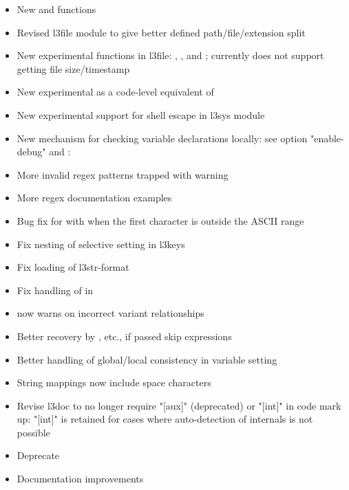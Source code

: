 \documentclass{ltnews}
\begin{document}
\begin{itemize}
\item New  and  functions
\item Revised l3file module to give better defined
  path/file/extension split
\item New experimental functions in l3file: ,
  ,  and
  ; currently  does not support
  getting file size/timestamp
\item New experimental  as a code-level
  equivalent of 
\item New experimental support for shell escape in l3sys module
\item New mechanism for checking variable declarations locally:
  see option "enable-debug" and
  :
\item More invalid regex patterns trapped with warning
\item More regex documentation examples
\item Bug fix for  with  when the first
  character is outside the ASCII range
\item Fix nesting of selective setting in l3keys
\end{itemize}

\begin{itemize}
 \item Fix loading of l3str-format
 \item Fix handling of  in 
 \item {} now warns on incorrect variant
   relationships
 \item Better recovery by , etc., if passed
   skip expressions
 \item Better handling of global/local consistency in variable
   setting
 \item String mappings now include space characters
 \item Revise l3doc to no longer require "[aux]" (deprecated) or
   "[int]" in code mark up: "[int]" is retained for cases where
   auto-detection of internals is not possible
 \item Deprecate 
 \item Documentation improvements
\end{itemize}
\end{document}
